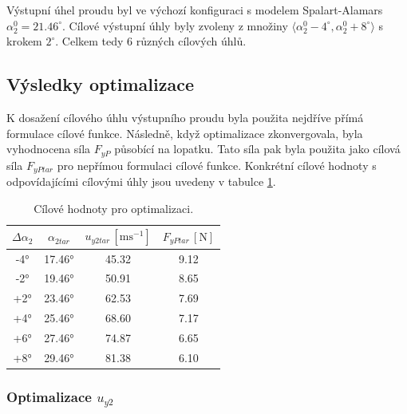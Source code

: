 Výstupní úhel proudu byl ve výchozí konfiguraci s modelem Spalart-Alamars $ \alpha_{2}^{0}=21.46^{\circ} $. Cílové výstupní úhly byly zvoleny z množiny $ \langle \alpha_{2}^{0}-4^{\circ}, \alpha_{2}^{0}+8^{\circ} \rangle $ s krokem $ 2^{\circ} $. Celkem tedy 6 různých cílových úhlů.

\subsection{Výsledky optimalizace}
K dosažení cílového úhlu výstupního proudu byla použita nejdříve přímá formulace cílové funkce. Následně, když optimalizace zkonvergovala, byla vyhodnocena síla $ F_{yP} $ působící na lopatku. Tato síla pak byla použita jako cílová síla $ F_{yPtar} $ pro nepřímou formulaci cílové funkce. Konkrétní cílové hodnoty s odpovídajícími cílovými úhly jsou uvedeny v tabulce \ref{tab:cilove_hodnoty}.

\begin{table}
	\begin{ctucolortab}
		\begin{tabular}{c|c||c|c}
			
			$ \Delta\alpha_{2} $ &$ \alpha_{2tar} $ & $ u_{y2tar}\,[\mathrm{ms^{-1}}] $ & $ F_{yPtar}\,[\mathrm{N}] $ \\
			\hline
			-4° & 17.46° & 45.32 & 9.12 \\
			
			-2° & 19.46° & 50.91 & 8.65 \\
			
			+2° & 23.46° & 62.53 & 7.69 \\
			
			+4° & 25.46° & 68.60 & 7.17 \\
			
			+6° & 27.46° & 74.87 & 6.65 \\
			
			+8° & 29.46° & 81.38 & 6.10 \\
			
		\end{tabular}
	\end{ctucolortab}
	\caption{Cílové hodnoty pro optimalizaci.}
	\label{tab:cilove_hodnoty}
\end{table}

\subsubsection{Optimalizace $ u_{y2} $}

